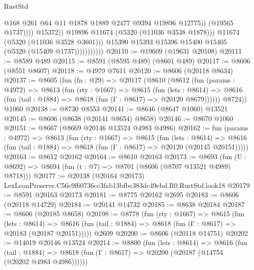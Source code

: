 \begin{lexlean}{RustStd}
\begin{coremodule}
                                        @168
                                        @261
                                        @64
                                        @11
                                        @1878
                                        @1889
                                        @2477
                                        @9394
                                        @19896
                                        @12775))
                                    (@19565 @1737))))
                              @15372))
                          @19896
                          @11674
                          (@5320 (@11036 @3538 @1878)))
                        @11674
                        (@5320 (@11036 @3528 @3601)))
                      @15390
                      @15393
                      @15396
                      @15400
                      @15405
                      (@5320 (@15409 @1737)))))))))))
@20110 := @19609 (@19631 @20108)
@20111 := @8589 @489
@20115 := @8591 (@8595 @489) (@8601 @489)
@20117 := @8606 (@8551 @8607)
@20118 := @4979 @7611
@20120 := @8606 (@20118 @8634)
@20137 := @8605
    (fun (fn : @29) =>
    @20117
      (@8610
        (@8612
          (fun (params : @4972) =>
          @8613
            (fun (rty : @1667) =>
            @8615
              (fun (lets : @8614) =>
              @8616 (fun (tail : @1884) => @8618 (fun (Γ : @8617) => @20120 @8679))))))
        @8724))
    @1060
@20138 := @8730 @8553
@20141 := @8646 (@8647 @1060) @13521
@20145 := @8606 (@8638 (@20141 @8654) @8658)
@20146 := @8670 @1060
@20151 := @8667 (@8669 @20146 @13524 @4983 @4986)
@20162 := fun (params : @4972) =>
  @8613
    (fun (rty : @1667) =>
    @8615
      (fun (lets : @8614) =>
      @8616 (fun (tail : @1884) => @8618 (fun (Γ : @8617) => @20120 (@20145 @20151)))))
@20163 := @8612 @20162
@20164 := @8610 @20163
@20173 := @8693
    (fun (U : @8692) => @8694 (fun (t : @7) => @8701 (@8606 (@8707 @13521 @4989) @8718)))
@20177 := @20138 (@20164 @20173) LexLeanPreserve.C56c9f60736cc3fab13bfbc383dc49ebd.R0.RustStd.look18
@20179 := @8591 @20163 @20173
@20181 := @8775 @20162 @2695
@20183 := @8606 (@20118 @14729)
@20184 := @20141 @14732
@20185 := @8638 @20184
@20187 := @8606 (@20185 @8658)
@20198 := @8778
    (fun (rty : @1667) =>
    @8615
      (fun (lets : @8614) =>
      @8616 (fun (tail : @1884) => @8618 (fun (Γ : @8617) => @20183 (@20187 @20151)))))
    @2609
@20200 := @8606 (@20118 @14751)
@20202 := @14019 @20146 @13524
@20214 := @8800
    (fun (lets : @8614) =>
    @8616
      (fun (tail : @1884) =>
      @8618 (fun (Γ : @8617) => @20200 (@20187 (@14754 (@20202 @4983 @4986))))))

\end{coremodule}
\end{lexlean}
